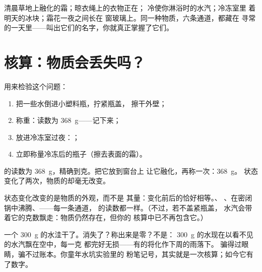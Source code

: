 \begin{example}[身边的通道]\label{ex:g6:water-states:doors}
清晨草地上融化的霜；晾衣绳上的衣物正在；
冷使你淋浴时的水汽；冷冻室里
着明天的冰块；霜花一夜之间长在
窗玻璃上。同一种物质，六条通道，都藏在
寻常的一天里——叫出它们的名字，你就真正掌握了它们。
\end{example}

\section{核算：物质会丢失吗？}

\begin{method}[称量状态变化]\label{met:g6:water-states:weigh}
用来检验这个问题：
\begin{enumerate}
  \item 把一些水倒进小塑料瓶，拧紧瓶盖，
        擦干外壁；
  \item 称重：读数为 \qty{368}{g}——记下来；
  \item 放进冷冻室过夜：；
  \item 立即称量冷冻后的瓶子（擦去表面的霜）。
\end{enumerate}
的读数为 \qty{368}{g}，精确到克。把它放到窗台上
让它融化，再称一次：\qty{368}{g}。
状态变化了两次，物质的却毫无改变。
\end{method}

\begin{proposition}[状态变化不改变质量]\label{prop:g6:water-states:mass}
状态变化改变的是物质的外观，而不是
其量：变化前后的恰好相等。、
、在密闭锅中沸腾、——每一条通道，
的读数都一样。（不过，若不盖紧瓶盖，
水汽会带着它的克数飘走：物质仍然存在，但你的
核算中已不再包含它。）
\end{proposition}

\begin{example}[水坑里的克数去哪儿了]\label{ex:g6:water-states:puddle}
一个 \qty{300}{g} 的水洼干了。消失了？称出来是零？不是：
\qty{300}{g} 的水现在以看不见的水汽飘在空中，每一克
都完好无损——有的将化作下周的雨落下。
骗得过眼睛，骗不过账本。你童年水坑实验里的
粉笔记号，其实就是一次核算；如今它有了数字。
\end{example}

